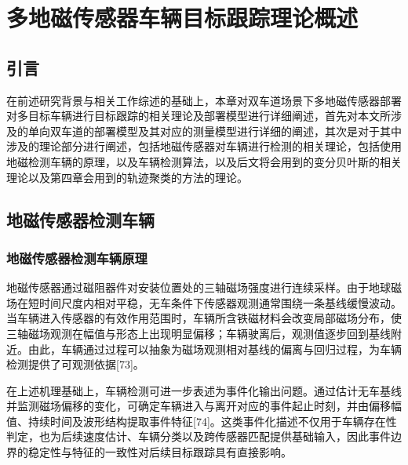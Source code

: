 \documentclass{xdupgthesis}
\begin{document}
\chapter{多地磁传感器车辆目标跟踪理论概述}
\label{ch:ch2_event_detect}

\section{引言}\label{sec:ch2_intro}

在前述研究背景与相关工作综述的基础上，本章对双车道场景下多地磁传感器部署对多目标车辆进行目标跟踪的相关理论及部署模型进行详细阐述，首先对本文所涉及的单向双车道的部署模型及其对应的测量模型进行详细的阐述，其次是对于其中涉及的理论部分进行阐述，包括地磁传感器对车辆进行检测的相关理论，包括使用地磁检测车辆的原理，以及车辆检测算法，以及后文将会用到的变分贝叶斯的相关理论以及第四章会用到的轨迹聚类的方法的理论。


\section{地磁传感器检测车辆}\label{sec:ch2_principle}

\subsection{地磁传感器检测车辆原理}\label{sec:ch2_basic}

地磁传感器通过磁阻器件对安装位置处的三轴磁场强度进行连续采样。由于地球磁场在短时间尺度内相对平稳，无车条件下传感器观测通常围绕一条基线缓慢波动。当车辆进入传感器的有效作用范围时，车辆所含铁磁材料会改变局部磁场分布，使三轴磁场观测在幅值与形态上出现明显偏移；车辆驶离后，观测值逐步回到基线附近。由此，车辆通过过程可以抽象为磁场观测相对基线的偏离与回归过程，为车辆检测提供了可观测依据[73]。


在上述机理基础上，车辆检测可进一步表述为事件化输出问题。通过估计无车基线并监测磁场偏移的变化，可确定车辆进入与离开对应的事件起止时刻，并由偏移幅值、持续时间及波形结构提取事件特征[74]。这类事件化描述不仅用于车辆存在性判定，也为后续速度估计、车辆分类以及跨传感器匹配提供基础输入，因此事件边界的稳定性与特征的一致性对后续目标跟踪具有直接影响。
\end{document}
